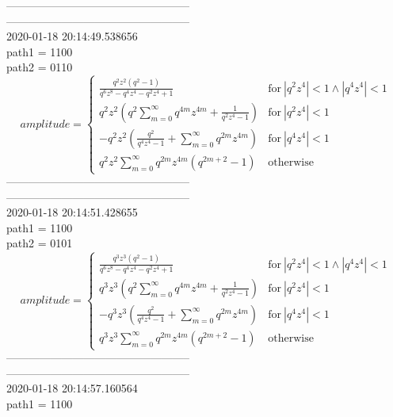 \documentclass{jsreport}
\begin{document}
--------------------------------------------------\\
--------------------------------------------------\\
2020-01-18 20:14:49.538656\\
path1 = 1100\\
path2 = 0110\\
$$amplitude = \begin{cases} \frac{q^{2} z^{2} \left(q^{2} - 1\right)}{q^{6} z^{8} - q^{4} z^{4} - q^{2} z^{4} + 1} & \text{for}\: \left|{q^{2} z^{4}}\right| < 1 \wedge \left|{q^{4} z^{4}}\right| < 1 \\q^{2} z^{2} \left(q^{2} \sum_{m=0}^{\infty} q^{4 m} z^{4 m} + \frac{1}{q^{2} z^{4} - 1}\right) & \text{for}\: \left|{q^{2} z^{4}}\right| < 1 \\- q^{2} z^{2} \left(\frac{q^{2}}{q^{4} z^{4} - 1} + \sum_{m=0}^{\infty} q^{2 m} z^{4 m}\right) & \text{for}\: \left|{q^{4} z^{4}}\right| < 1 \\q^{2} z^{2} \sum_{m=0}^{\infty} q^{2 m} z^{4 m} \left(q^{2 m + 2} - 1\right) & \text{otherwise} \end{cases}$$
--------------------------------------------------\\
--------------------------------------------------\\
2020-01-18 20:14:51.428655\\
path1 = 1100\\
path2 = 0101\\
$$amplitude = \begin{cases} \frac{q^{3} z^{3} \left(q^{2} - 1\right)}{q^{6} z^{8} - q^{4} z^{4} - q^{2} z^{4} + 1} & \text{for}\: \left|{q^{2} z^{4}}\right| < 1 \wedge \left|{q^{4} z^{4}}\right| < 1 \\q^{3} z^{3} \left(q^{2} \sum_{m=0}^{\infty} q^{4 m} z^{4 m} + \frac{1}{q^{2} z^{4} - 1}\right) & \text{for}\: \left|{q^{2} z^{4}}\right| < 1 \\- q^{3} z^{3} \left(\frac{q^{2}}{q^{4} z^{4} - 1} + \sum_{m=0}^{\infty} q^{2 m} z^{4 m}\right) & \text{for}\: \left|{q^{4} z^{4}}\right| < 1 \\q^{3} z^{3} \sum_{m=0}^{\infty} q^{2 m} z^{4 m} \left(q^{2 m + 2} - 1\right) & \text{otherwise} \end{cases}$$
--------------------------------------------------\\
--------------------------------------------------\\
2020-01-18 20:14:57.160564\\
path1 = 1100\\
\end{document}
